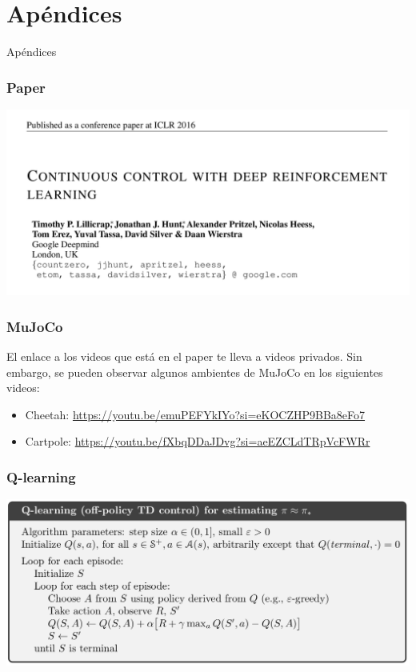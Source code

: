 \documentclass[
    11pt,
    aspectratio=169,
]{beamer}
\begin{document}
\section{Apéndices}

\begin{frame}

\begin{center}
{\huge Apéndices}
\end{center}

\end{frame}

\begin{frame}
\frametitle{Paper}

\begin{center}
\includegraphics[scale=0.2]{Images/continuous_control}
\end{center}

\end{frame}

\begin{frame}
\frametitle{MuJoCo}

El enlace a los videos que está en el paper te lleva a videos privados. Sin embargo, se pueden observar algunos ambientes de MuJoCo en los siguientes videos:

\begin{itemize}
\item Cheetah: \url{https://youtu.be/emuPEFYkIYo?si=eKOCZHP9BBa8eFo7}
\item Cartpole: \url{https://youtu.be/fXbqDDaJDvg?si=aeEZCLdTRpVcFWRr}
\end{itemize}

\end{frame}

\begin{frame}
\frametitle{Q-learning}

\begin{center}
\includegraphics[scale=0.25]{Images/q_learning}
\end{center}

\end{frame}
\end{document}
